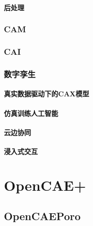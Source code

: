 \documentclass[letterpaper,10pt,english]{sphinxmanual}
\begin{document}
\subsubsection{后处理}
\label{\detokenize{src/fengsim/airfoil:id3}}

\subsection{CAM}
\label{\detokenize{src/fengsim/airfoil:cam}}

\subsection{CAI}
\label{\detokenize{src/fengsim/airfoil:cai}}

\subsection{数字孪生}
\label{\detokenize{src/fengsim/airfoil:id4}}

\subsubsection{真实数据驱动下的CAX模型}
\label{\detokenize{src/fengsim/airfoil:cax}}

\subsubsection{仿真训练人工智能}
\label{\detokenize{src/fengsim/airfoil:id5}}

\subsubsection{云边协同}
\label{\detokenize{src/fengsim/airfoil:id6}}

\subsubsection{浸入式交互}
\label{\detokenize{src/fengsim/airfoil:id7}}
\sphinxstepscope


\chapter{OpenCAE+}
\label{\detokenize{src/opencaeplus/main:opencae}}\label{\detokenize{src/opencaeplus/main::doc}}

\section{OpenCAEPoro}
\label{\detokenize{src/opencaeplus/main:opencaeporo}}
\end{document}
